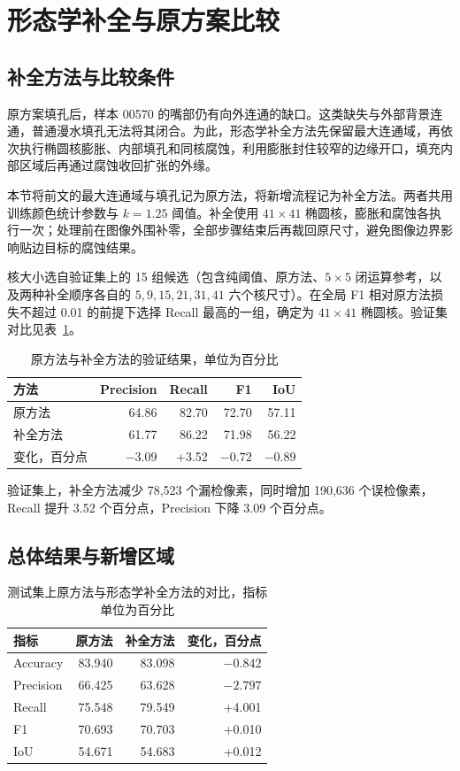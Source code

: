 \clearpage
\section{形态学补全与原方案比较}
\subsection{补全方法与比较条件}

原方案填孔后，样本 00570 的嘴部仍有向外连通的缺口。这类缺失与外部背景连通，普通漫水填孔无法将其闭合。为此，形态学补全方法先保留最大连通域，再依次执行椭圆核膨胀、内部填孔和同核腐蚀，利用膨胀封住较窄的边缘开口，填充内部区域后再通过腐蚀收回扩张的外缘。

本节将前文的最大连通域与填孔记为原方法，将新增流程记为补全方法。两者共用训练颜色统计参数与 $k=1.25$ 阈值。补全使用 $41\times41$ 椭圆核，膨胀和腐蚀各执行一次；处理前在图像外围补零，全部步骤结束后再裁回原尺寸，避免图像边界影响贴边目标的腐蚀结果。

核大小选自验证集上的 15 组候选（包含纯阈值、原方法、$5\times5$ 闭运算参考，以及两种补全顺序各自的 $5,9,15,21,31,41$ 六个核尺寸）。在全局 F1 相对原方法损失不超过 0.01 的前提下选择 Recall 最高的一组，确定为 $41\times41$ 椭圆核。验证集对比见表~\ref{tab:morphvalidation}。

\begin{table}[H]
\centering\small
\caption{原方法与补全方法的验证结果，单位为百分比}\label{tab:morphvalidation}
\begin{tabular}{lrrrr}
\toprule
方法 & Precision & Recall & F1 & IoU \\
\midrule
原方法 & 64.86 & 82.70 & 72.70 & 57.11 \\
补全方法 & 61.77 & 86.22 & 71.98 & 56.22 \\
变化，百分点 & $-3.09$ & +3.52 & $-0.72$ & $-0.89$ \\
\bottomrule
\end{tabular}
\end{table}

验证集上，补全方法减少 78,523 个漏检像素，同时增加 190,636 个误检像素，Recall 提升 3.52 个百分点，Precision 下降 3.09 个百分点。

\subsection{总体结果与新增区域}

\begin{table}[H]
\centering\small
\caption{测试集上原方法与形态学补全方法的对比，指标单位为百分比}\label{tab:morphtest}
\begin{tabular}{lrrr}
\toprule
指标 & 原方法 & 补全方法 & 变化，百分点 \\
\midrule
Accuracy & 83.940 & 83.098 & $-0.842$ \\
Precision & 66.425 & 63.628 & $-2.797$ \\
Recall & 75.548 & 79.549 & +4.001 \\
F1 & 70.693 & 70.703 & +0.010 \\
IoU & 54.671 & 54.683 & +0.012 \\
\bottomrule
\end{tabular}
\end{table}

